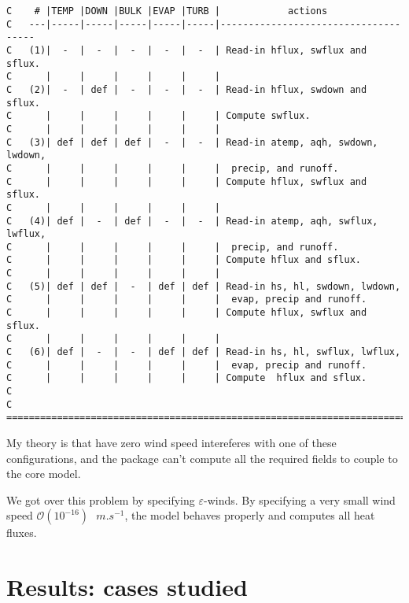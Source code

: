 \documentclass[11pt]{article}
\begin{document}
\begin{lstlisting}[caption={Available configurations for running the EXF package}]
C    # |TEMP |DOWN |BULK |EVAP |TURB |            actions
C   ---|-----|-----|-----|-----|-----|-------------------------------------
C   (1)|  -  |  -  |  -  |  -  |  -  | Read-in hflux, swflux and sflux.
C      |     |     |     |     |     |
C   (2)|  -  | def |  -  |  -  |  -  | Read-in hflux, swdown and sflux.
C      |     |     |     |     |     | Compute swflux.
C      |     |     |     |     |     |
C   (3)| def | def | def |  -  |  -  | Read-in atemp, aqh, swdown, lwdown,
C      |     |     |     |     |     |  precip, and runoff.
C      |     |     |     |     |     | Compute hflux, swflux and sflux.
C      |     |     |     |     |     |
C   (4)| def |  -  | def |  -  |  -  | Read-in atemp, aqh, swflux, lwflux,
C      |     |     |     |     |     |  precip, and runoff.
C      |     |     |     |     |     | Compute hflux and sflux.
C      |     |     |     |     |     |
C   (5)| def | def |  -  | def | def | Read-in hs, hl, swdown, lwdown,
C      |     |     |     |     |     |  evap, precip and runoff.
C      |     |     |     |     |     | Compute hflux, swflux and sflux.
C      |     |     |     |     |     |
C   (6)| def |  -  |  -  | def | def | Read-in hs, hl, swflux, lwflux,
C      |     |     |     |     |     |  evap, precip and runoff.
C      |     |     |     |     |     | Compute  hflux and sflux.
C
C   =======================================================================
\end{lstlisting}

My theory is that have zero wind speed intereferes with one of these configurations, and the package can't compute all the required fields to couple to the core model.

We got over this problem by specifying $\varepsilon$-winds. By specifying a very small wind speed $\mathcal{O}(10^{-16}) \textrm{ } \si{m.s^{-1}}$, the model behaves properly and computes all heat fluxes.

\section{Results: cases studied}
\end{document}
